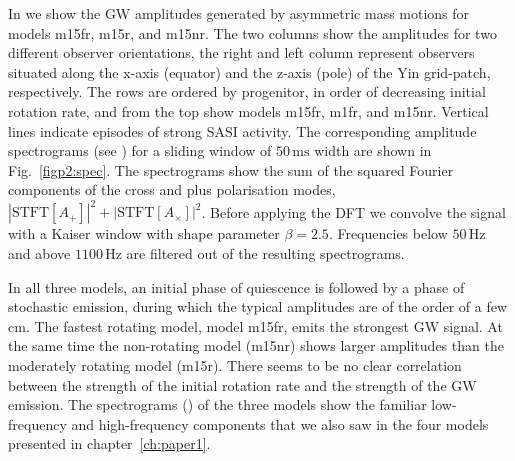 In  we show the GW amplitudes generated by asymmetric mass motions for models m15fr, m15r, and m15nr.
The two columns show the amplitudes for two different observer orientations,
the right and left column represent observers situated along the x-axis (equator) and the z-axis (pole) of the Yin grid-patch,
respectively. The rows are ordered by progenitor, in order of decreasing initial rotation rate, and from the top
show models m15fr, m1fr, and m15nr. Vertical lines indicate episodes of strong SASI activity.
The corresponding amplitude spectrograms (see ) for a sliding window of $50 \, \mathrm{ms}$ width are shown 
in Fig.~\ref{figp2:spec}. The spectrograms show the sum of the squared Fourier
components of the cross and plus polarisation modes,
$|\text{STFT}[{A_+}]|^2 + |\text{STFT}[{A_{\times}}]|^2$. Before applying the
DFT we convolve the signal with a Kaiser window with shape parameter $\beta = 2.5$. Frequencies
below $50 \, \mathrm{Hz}$ and above $1100  \, \mathrm{Hz}$ are filtered out of the resulting spectrograms. 

In all three models, an initial phase of quiescence is followed by a phase of stochastic emission, 
during which the typical amplitudes are of the order of a few cm. The fastest rotating model, model m15fr, 
emits the strongest GW signal. 
At the same time the non-rotating model (m15nr) shows larger amplitudes than the moderately rotating model (m15r).
There seems to be no clear correlation between the strength of the initial rotation rate and the strength of the GW emission. 
The spectrograms () of the three models show the familiar low-frequency and high-frequency 
components that we also saw in the four models presented in chapter~\ref{ch:paper1}.

